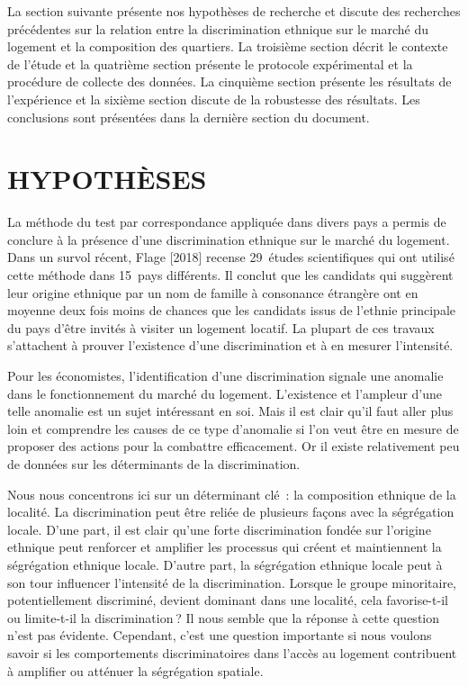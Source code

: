 \documentclass[10pt]{Revue-economique} %
\begin{document}
La section suivante présente nos hypothèses de recherche et discute des recherches précédentes sur la relation entre la discrimination ethnique sur le marché du logement et la composition des quartiers. La troisième section décrit le contexte de l’étude et la quatrième section présente le protocole expérimental et la procédure de collecte des données. La cinquième section présente les résultats de l’expérience et la sixième section discute de la robustesse des résultats. Les conclusions sont présentées dans la dernière section du document.

\section{HYPOTHÈSES}

La méthode du test par correspondance appliquée dans divers pays a permis de conclure à la présence d’une discrimination ethnique sur le marché du logement. Dans un survol récent, Flage [2018] recense 29 études scientifiques qui ont utilisé cette méthode dans 15 pays différents. Il conclut que les candidats qui suggèrent leur origine ethnique par un nom de famille à consonance étrangère ont en moyenne deux fois moins de chances que les candidats issus de l’ethnie principale du pays d’être invités à visiter un logement locatif. La plupart de ces travaux s’attachent à prouver l’existence d’une discrimination et à en mesurer l’intensité.

Pour les économistes, l’identification d’une discrimination signale une anomalie dans le fonctionnement du marché du logement. L’existence et l’ampleur d’une telle anomalie est un sujet intéressant en soi. Mais il est clair qu’il faut aller plus loin et comprendre les causes de ce type d’anomalie si l’on veut être en mesure de proposer des actions pour la combattre efficacement. Or il existe relativement peu de données sur les déterminants de la discrimination.

Nous nous concentrons ici sur un déterminant clé : la composition ethnique de la localité. La discrimination peut être reliée de plusieurs façons avec la ségrégation locale. D’une part, il est clair qu’une forte discrimination fondée sur l’origine ethnique peut renforcer et amplifier les processus qui créent et maintiennent la ségrégation ethnique locale. D’autre part, la ségrégation ethnique locale peut à son tour influencer l’intensité de la discrimination. Lorsque le groupe minoritaire, potentiellement discriminé, devient dominant dans une localité, cela favorise-t-il ou limite-t-il la discrimination ? Il nous semble que la réponse à cette question n’est pas évidente. Cependant, c’est une question importante si nous voulons savoir si les comportements discriminatoires dans l’accès au logement contribuent à amplifier ou atténuer la ségrégation spatiale.
\end{document}
